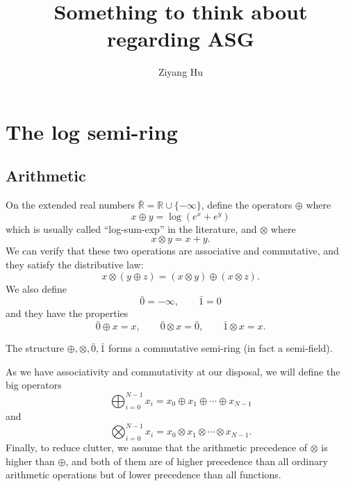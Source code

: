 \documentclass[a4paper]{article}
\title{Something to think about regarding ASG}
\author{Ziyang Hu}
\begin{document}
\maketitle
\tableofcontents
\section{The log semi-ring}

\subsection{Arithmetic}

On the extended real numbers $\bar{\mathbb{R}}=\mathbb{R}\cup \{-\infty\}$, define the operators $\oplus$ where
\begin{equation}
x \oplus y = \log(e^x+e^y)
\end{equation}
which is usually called ``log-sum-exp'' in the literature, and $\otimes$ where
\begin{equation}
x \otimes y = x + y.
\end{equation}
We can verify that these two operations are associative and commutative, and they satisfy the distributive law:
\begin{equation}
x\otimes(y\oplus z) = (x\otimes y)\oplus(x\otimes z).
\end{equation}
We also define
\begin{equation}
\bar{0} = -\infty, \qquad \bar{1} = 0
\end{equation}
and they have the properties
\begin{equation}
\bar{0}\oplus x = x, \qquad \bar{0}\otimes x = \bar{0}, \qquad \bar{1}\otimes x = x.
\end{equation}

The structure $\oplus, \otimes, \bar{0}, \bar{1}$ forms a commutative semi-ring (in fact a semi-field).

As we have associativity and commutativity at our disposal, we will define the big operators
\begin{equation}
\bigoplus_{i=0}^{N-1} x_i = x_0 \oplus x_1 \oplus \cdots \oplus x_{N-1}
\end{equation}
and
\begin{equation}
\bigotimes_{i=0}^{N-1} x_i = x_0 \otimes x_1 \otimes \cdots \otimes x_{N-1}.
\end{equation}
Finally, to reduce clutter, we assume that the arithmetic precedence of $\otimes$ is higher than $\oplus$, and both of them are of higher precedence than all ordinary arithmetic operations but of lower precedence than all functions. 
\end{document}

